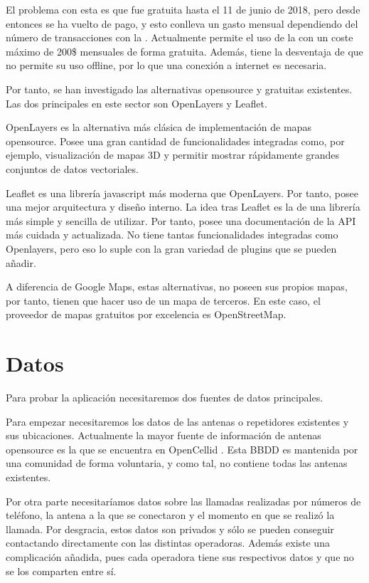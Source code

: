     El problema con esta  es que fue gratuita hasta el 11 de junio de 2018, pero desde entonces se ha vuelto de pago, y esto conlleva un gasto mensual dependiendo del número de transacciones con la . Actualmente permite el uso de la  con un coste máximo de 200\$ mensuales de forma gratuita. Además, tiene la desventaja de que no permite su uso offline, por lo que una conexión a internet es necesaria.

    
    Por tanto, se han investigado las alternativas opensource y gratuitas existentes. Las dos  principales en este sector son OpenLayers\cite{openlayers} y Leaflet\cite{leaflet}.
    
    OpenLayers es la alternativa más clásica de implementación de mapas opensource. Posee una gran cantidad de funcionalidades integradas como, por ejemplo, visualización de mapas 3D y permitir mostrar rápidamente grandes conjuntos de datos vectoriales.
    
    Leaflet es una librería javascript más moderna que OpenLayers. Por tanto, posee una mejor arquitectura y diseño interno. La idea tras Leaflet es la de una librería más simple y sencilla de utilizar. Por tanto, posee una documentación de la API más cuidada y actualizada. No tiene tantas funcionalidades integradas como Openlayers, pero eso lo suple con la gran variedad de plugins que se pueden añadir.
    
    A diferencia de Google Maps, estas alternativas, no poseen sus propios mapas, por tanto, tienen que hacer uso de un mapa de terceros. En este caso, el proveedor de mapas gratuitos por excelencia es OpenStreetMap\cite{osm}.
  \section{Datos}
  Para probar la aplicación necesitaremos dos fuentes de datos principales.
  
  Para empezar necesitaremos los datos de las antenas o repetidores existentes y sus ubicaciones. Actualmente la mayor fuente de información de antenas opensource es la que se encuentra en OpenCellid \cite{opencellid}. Esta BBDD es mantenida por una comunidad de forma voluntaria, y como tal, no contiene todas las antenas existentes.
  
  Por otra parte necesitaríamos datos sobre las llamadas realizadas por números de teléfono, la antena a la que se conectaron y el momento en que se realizó la llamada. Por desgracia, estos datos son privados y sólo se pueden conseguir contactando directamente con las distintas operadoras. Además existe una complicación añadida, pues cada operadora tiene sus respectivos datos y que no se los comparten entre sí.
  
